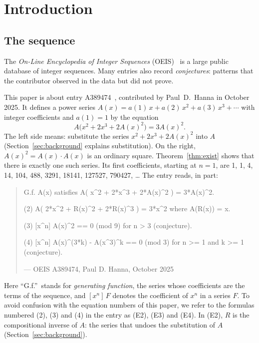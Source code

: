 \documentclass[11pt,a4paper]{article}
\theoremstyle{definition}
\theoremstyle{remark}
\begin{document}
\section{Introduction}

\subsection{The sequence}\label{sec:sequence}
The \emph{On-Line Encyclopedia of Integer Sequences} (OEIS)~\cite{oeisdb} is a large public database of integer
sequences. Many
entries also record \emph{conjectures}: patterns that the contributor observed in the data but did not prove.

This paper is about entry A389474~\cite{oeis}, contributed by Paul~D.~Hanna in October 2025. It defines a power series
$A(x)=a(1)\,x+a(2)\,x^2+a(3)\,x^3+\cdots$ with integer coefficients and $a(1)=1$ by the equation
\begin{equation}\label{eq:oeis}
A\bigl(x^2+2x^3+2A(x)^2\bigr)=3A(x)^2 .
\end{equation}
The left side means: substitute the series $x^2+2x^3+2A(x)^2$ into $A$ (Section~\ref{sec:background} explains
substitution). On the right, $A(x)^2=A(x)\cdot A(x)$ is an ordinary square. Theorem~\ref{thm:exist} shows that there
is exactly one such series. Its first coefficients, starting at $n=1$, are 1, 1, 4, 14, 104, 488, 3291, 18141, 127527, 790427, \dots{}
The entry reads, in part:
\begin{quote}\small\ttfamily\raggedright G.f. A(x) satisfies A( x\^{}2 + 2*x\^{}3 + 2*A(x)\^{}2 ) = 3*A(x)\^{}2.\par\smallskip (2) A( 2*x\^{}2 + R(x)\^{}2 + 2*R(x)\^{}3 ) = 3*x\^{}2 where A(R(x)) = x.\par\smallskip (3) [x\^{}n] A(x)\^{}2 == 0 (mod 9) for n > 3 (conjecture).\par\smallskip (4) [x\^{}n] A(x)\^{}(3*k) - A(x\^{}3)\^{}k == 0 (mod 3) for n >= 1 and k >= 1 (conjecture).\par\smallskip\hfill\textrm{--- OEIS A389474, Paul D. Hanna, October 2025}\end{quote}

Here ``G.f.''\ stands for \emph{generating function}, the series whose coefficients are the terms of the sequence, and
$[x^n]\,F$ denotes the coefficient of $x^n$ in a series $F$. To avoid confusion with the equation numbers of this paper,
we refer to the formulas numbered (2), (3) and (4) in the entry as (E2), (E3) and (E4). In (E2), $R$ is the
compositional inverse of $A$: the series that undoes the substitution of $A$ (Section~\ref{sec:background}).
\end{document}

